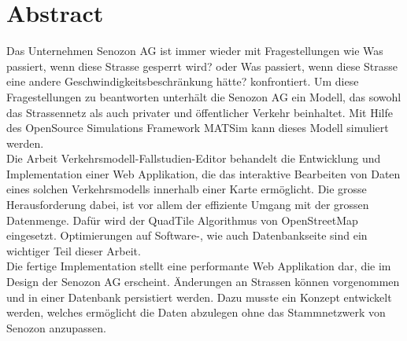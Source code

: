 \chapter{Abstract}
Das Unternehmen Senozon AG ist immer wieder mit Fragestellungen wie \glqq{}Was passiert, wenn diese Strasse gesperrt wird?\grqq{} oder \glqq{}Was passiert, wenn diese Strasse eine andere Geschwindigkeitsbeschränkung hätte?\grqq{} konfrontiert. Um diese Fragestellungen zu beantworten unterhält die Senozon AG ein Modell, das sowohl das Strassennetz als auch privater und öffentlicher Verkehr beinhaltet. Mit Hilfe des OpenSource Simulations Framework MATSim kann dieses Modell simuliert werden.\\
Die Arbeit \glqq{}Verkehrsmodell-Fallstudien-Editor\grqq{} behandelt die Entwicklung und Implementation einer Web Applikation, die das interaktive Bearbeiten von Daten eines solchen Verkehrsmodells innerhalb einer Karte ermöglicht. Die grosse Herausforderung dabei, ist vor allem der effiziente Umgang mit der grossen Datenmenge. Dafür wird der QuadTile Algorithmus von OpenStreetMap \cite{OSMQuadTiles} eingesetzt. Optimierungen auf Software-, wie auch Datenbankseite sind ein wichtiger Teil dieser Arbeit.\\Die fertige Implementation stellt eine performante Web Applikation dar, die im Design der Senozon AG erscheint. Änderungen an Strassen können vorgenommen und in einer Datenbank persistiert werden. Dazu musste ein Konzept entwickelt werden, welches ermöglicht die Daten abzulegen ohne das Stammnetzwerk von Senozon anzupassen.\\